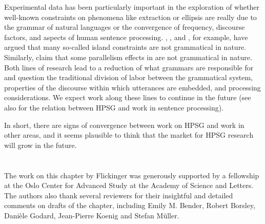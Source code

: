 \documentclass[output=paper,biblatex,babelshorthands,newtxmath,draftmode,colorlinks,citecolor=brown]{langscibook}
\begin{document}
Experimental data has been particularly important in the exploration of whether well-known
constraints on phenomena like extraction or ellipsis are really due to the grammar of natural
languages or the convergence of frequency, discourse factors, and aspects of human sentence
processing. \citet{HS2010a-u}, \citet{CD2019a-u}, and \citet{CP2020a-u}, for
example, have argued that many so-called island constraints are not grammatical in
nature. Similarly, \citet{SAHM2019a-u} claim that some parallelism
effects in  are not grammatical in nature. Both lines of research lead to a
reduction of what grammars are responsible for and question the traditional division of labor
between the grammatical system, properties of the discourse within which utterances are embedded,
and processing considerations. We expect work along these lines to continue in the future (see also
 for the relation between HPSG and work in sentence processing).
 
In short, there are signs of convergence between work on HPSG and work in other areas, and it seems
plausible to think that the market for HPSG research will grow in the future.

\section*{\acknowledgmentsUS}

The work on this chapter by Flickinger was generously supported by a fellowship at the Oslo Center for Advanced Study at the  Academy of Science and Letters.  The authors also thank several reviewers for their insightful and detailed comments on drafts of the chapter, including Emily M. Bender, Robert Borsley, Danièle Godard, Jean-Pierre Koenig and Stefan Müller.


{\sloppy
\printbibliography[heading=subbibliography,notkeyword=this]
}
\end{document}
